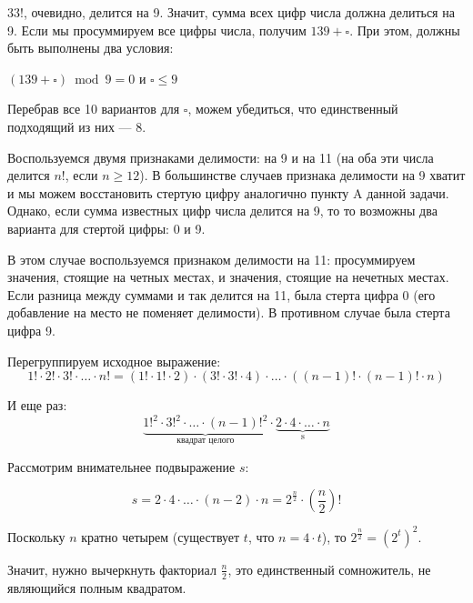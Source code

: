 ﻿
\begin{itemize}
\itA $33!$, очевидно, делится на 9. Значит, сумма всех цифр числа должна делиться на 9.
Если мы просуммируем все цифры числа, получим $139+\square$. При этом, должны быть выполнены
два условия:
\begin{center} 
$(139+\square) \bmod 9 = 0$ и $\square \le 9$
\end{center}

Перебрав все 10 вариантов
для $\square$, можем убедиться, что единственный подходящий из них --- 8.

\itB Воспользуемся двумя признаками делимости: на 9 и на 11 (на оба эти числа делится $n!$, если $n \ge 12$).
В большинстве случаев признака делимости на 9 хватит и мы можем восстановить стертую цифру аналогично
пункту A данной задачи. Однако, если сумма известных цифр числа делится на 9, то
то возможны два варианта для стертой цифры: 0 и 9.

В этом случае воспользуемся признаком делимости на 11: просуммируем значения, стоящие на четных местах,
и значения, стоящие на нечетных местах. Если разница между суммами и так делится на 11, была стерта цифра 0
(его добавление на место не поменяет делимости). В противном случае была стерта цифра 9.

\itC Перегруппируем исходное выражение:
$$1! \cdot 2! \cdot 3! \cdot \ldots \cdot n! = (1! \cdot 1! \cdot 2) \cdot (3! \cdot 3! \cdot 4) \cdot \ldots \cdot ((n-1)! \cdot (n-1)! \cdot n)$$

И еще раз:
$$\underbrace{1!^2 \cdot 3!^2 \cdot \ldots \cdot (n-1)!^2}_\textrm{квадрат целого} \cdot \underbrace{2 \cdot 4 \cdot \ldots \cdot n}_\textrm{s}$$

Рассмотрим внимательнее подвыражение $s$:

$$s = 2 \cdot 4 \cdot \ldots \cdot (n-2) \cdot n = 2^{\frac{n}{2}} \cdot \left(\frac{n}{2}\right)!$$

Поскольку $n$ кратно четырем (существует $t$, что $n = 4\cdot t$), то 
$2^{\frac{n}{2}} = (2^t)^2$.

Значит, нужно вычеркнуть факториал $\frac{n}{2}$, это единственный сомножитель, не являющийся полным квадратом.

\end{itemize}
